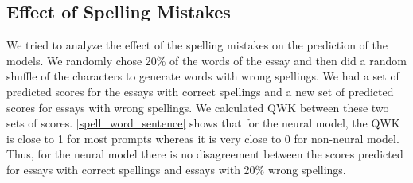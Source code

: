 \documentclass[11pt,a4paper]{article}
\begin{document}
\begin{table}[]
  \centering
  \caption{Effect of Length}
  \label{length}
  \end{table}


\subsection{Effect of Spelling Mistakes}
We tried to analyze the effect of the spelling mistakes on the prediction of the models. We randomly chose 20\% of the words of the essay and then did a random shuffle of the characters to generate words with wrong spellings. We had a set of predicted scores for the essays with correct spellings and a new set of predicted scores for essays with wrong spellings. We calculated QWK between these two sets of scores. \cref{spell_word_sentence} shows that for the neural model, the QWK is close to 1 for most prompts whereas it is very close to 0 for non-neural model. Thus, for the neural model there is no disagreement between the scores predicted for essays with correct spellings and essays with 20\% wrong spellings.
\end{document}
